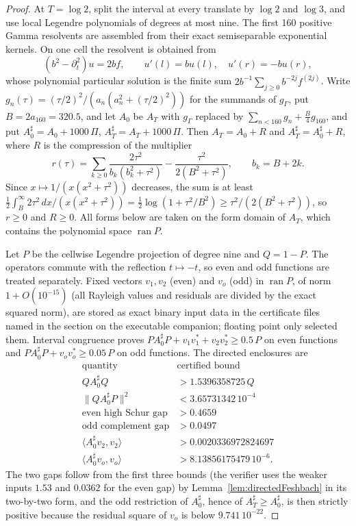 \documentclass[11pt]{amsart}
\theoremstyle{definition}
\theoremstyle{remark}
\begin{document}
\begin{proof}
At \(T=\log2\), split the interval at every translate by \(\log2\) and
\(\log3\), and use local Legendre polynomials of degrees at most nine.
The first 160 positive Gamma resolvents are assembled from their exact
semiseparable exponential kernels.  On one cell the resolvent is obtained
from
\[
 (b^2-\partial_t^2)u=2bf,\qquad
 u'(l)=bu(l),\quad u'(r)=-bu(r),
\]
whose polynomial particular solution is the finite sum
\(2b^{-1}\sum_{j\ge0}b^{-2j}f^{(2j)}\).  Write \(g_n(\tau)=(\tau/2)^2/
(a_n(a_n^2+(\tau/2)^2))\) for the summands of \(g_\Gamma\), put
\(B=2a_{160}=320.5\), and let \(A_0\) be \(A_T\) with \(g_\Gamma\) replaced
by \(\sum_{n<160}g_n+\frac B4g_{160}\), and put
\(A_0^\sharp=A_0+1000\,\Pi\), \(A_T^\sharp=A_T+1000\,\Pi\).  Then
\(A_T=A_0+R\) and \(A_T^\sharp=A_0^\sharp+R\), where \(R\) is
the compression of the multiplier
\[
 r(\tau)=\sum_{k\ge0}\frac{2\tau^2}{b_k(b_k^2+\tau^2)}
 -\frac{\tau^2}{2(B^2+\tau^2)},\qquad b_k=B+2k .
\]
Since \(x\mapsto1/(x(x^2+\tau^2))\) decreases, the sum is at least
\(\frac12\int_B^\infty 2\tau^2\,dx/(x(x^2+\tau^2))
=\frac12\log(1+\tau^2/B^2)\ge\tau^2/(2(B^2+\tau^2))\), so \(r\ge0\) and
\(R\ge0\).  All forms below are taken on the form domain of \(A_T\), which
contains the polynomial space \(\operatorname{ran}P\).

Let \(P\) be the cellwise Legendre projection of degree nine and \(Q=1-P\).
The operators commute with the reflection \(t\mapsto-t\), so even and odd
functions are treated separately.  Fixed vectors \(v_1,v_2\) (even) and
\(v_o\) (odd) in \(\operatorname{ran}P\), of norm \(1+O(10^{-15})\) (all
Rayleigh values and residuals are divided by the exact squared norm), are
stored as exact binary input data in the certificate files named in the
section on the executable companion; floating point only selected them.
Interval congruence proves \(PA_0^\sharp P+v_1v_1^*+v_2v_2^*\ge0.5\,P\) on
even functions and \(PA_0^\sharp P+v_ov_o^*\ge0.05\,P\) on odd functions.  The directed
enclosures are
\[
\begin{array}{c|c}
\text{quantity}&\text{certified bound}\\ \hline
 QA_0^\sharp Q&>1.5396358725\,Q\\
 \|QA_0^\sharp P\|^2&<3.65731342\,10^{-4}\\
 \text{even high Schur gap}&>0.4659\\
 \text{odd complement gap}&>0.0497\\
 \langle A_0^\sharp v_2,v_2\rangle&>0.0020336972824697\\
 \langle A_0^\sharp v_o,v_o\rangle&>8.13856175479\,10^{-6}.
\end{array}
\]
The two gaps follow from the first three bounds (the verifier uses the
weaker inputs \(1.53\) and \(0.0362\) for the even gap) by
Lemma~\ref{lem:directedFeshbach} in its two-by-two form, and the odd
restriction of \(A_0^\sharp\), hence of \(A_T^\sharp\ge A_0^\sharp\), is then
strictly positive
because the residual square of \(v_o\) is below \(9.741\,10^{-22}\).


\end{proof}
\end{document}
